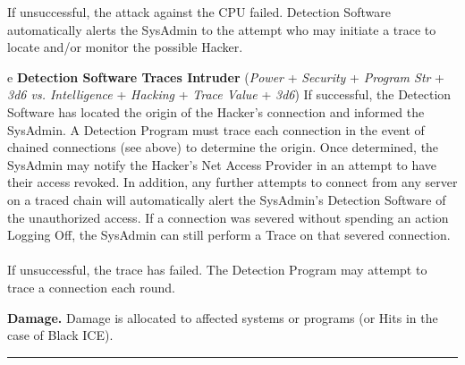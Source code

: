 \documentclass[11pt,twoside,a4paper]{article}
\newenvironment{local_enumerate}{
\begin{enumerate}
     \setlength{\itemsep}{1pt}
     \setlength{\parskip}{0pt}
     \setlength{\parsep}{0pt}}
{\end{enumerate}
}
\begin{document}
\begin{local_enumerate}
\begin{local_enumerate}
			If unsuccessful, the attack against the CPU failed. Detection Software automatically alerts the SysAdmin to the attempt who may initiate a trace to locate and/or monitor the possible Hacker.
		\item[e] \textbf{Detection Software Traces Intruder } (\emph{Power} + \emph{Security} + \emph{Program Str} + \emph{3d6 vs. Intelligence} + \emph{Hacking} + \emph{Trace Value} + \emph{3d6}) If successful, the Detection Software has located the origin of the Hacker's connection and informed the SysAdmin. A Detection Program must trace each connection in the event of chained connections (see above) to determine the origin. Once determined, the SysAdmin may notify the Hacker's Net Access Provider in an attempt to have their access revoked. In addition, any further attempts to connect from any server on a traced chain will automatically alert the SysAdmin's Detection Software of the unauthorized access. If a connection was severed without spending an action Logging Off, the SysAdmin can still perform a Trace on that severed connection. ~\\
		If unsuccessful, the trace has failed. The Detection Program may attempt to trace a connection each round.
	\end{local_enumerate}
	\item \textbf{Damage. } Damage is allocated to affected systems or programs (or Hits in the case of Black ICE).
\end{local_enumerate} %

\begin{center} \rule{0.85\textwidth}{0.01cm} \end{center}
\end{document}
